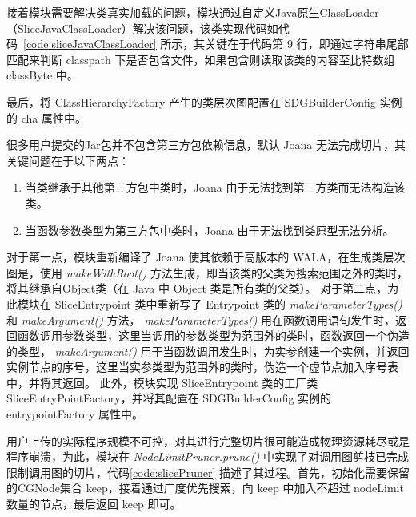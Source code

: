 \begin{minipage}[!htbp]{0.9\textwidth}
    
\end{minipage}

接着模块需要解决类真实加载的问题，模块通过自定义Java原生ClassLoader（SliceJavaClassLoader）解决该问题，该类实现代码如代码~\ref{code:sliceJavaClassLoader} 所示，其关键在于代码第 9 行，即通过字符串尾部匹配来判断 classpath 下是否包含文件，如果包含则读取该类的内容至比特数组 classByte 中。 

\begin{minipage}[!htbp]{0.9\textwidth}
    
\end{minipage}

最后，将 ClassHierarchyFactory 产生的类层次图配置在 SDGBuilderConfig 实例的 cha 属性中。

很多用户提交的Jar包并不包含第三方包依赖信息，默认 Joana 无法完成切片，其关键问题在于以下两点：
\begin{enumerate}
    \item 当类继承于其他第三方包中类时，Joana 由于无法找到第三方类而无法构造该类。
    \item 当函数参数类型为第三方包中类时，Joana 由于无法找到类原型无法分析。
\end{enumerate}

对于第一点，模块重新编译了 Joana 使其依赖于高版本的 WALA，在生成类层次图是，使用 \textit{makeWithRoot()} 方法生成，即当该类的父类为搜索范围之外的类时，将其继承自Object类（在 Java 中 Object 类是所有类的父类）。
对于第二点，为此模块在 SliceEntrypoint 类中重新写了 Entrypoint 类的\textit{ makeParameterTypes()} 和 \textit{makeArgument()} 方法，\textit{ makeParameterTypes()} 用在函数调用语句发生时，返回函数调用参数类型，这里当调用的参数类型为范围外的类时，函数返回一个伪造的类型，\textit{ makeArgument()} 用于当函数调用发生时，为实参创建一个实例，并返回实例节点的序号，这里当实参类型为范围外的类时，伪造一个虚节点加入序号表中，并将其返回。
此外，模块实现 SliceEntrypoint 类的工厂类 SliceEntryPointFactory，并将其配置在 SDGBuilderConfig 实例的 entrypointFactory 属性中。


用户上传的实际程序规模不可控，对其进行完整切片很可能造成物理资源耗尽或是程序崩溃，为此，模块在 \textit{NodeLimitPruner.prune()} 中实现了对调用图剪枝已完成限制调用图的切片，代码\ref{code:slicePruner} 描述了其过程。首先，初始化需要保留的CGNode集合 keep，接着通过广度优先搜索，向 keep 中加入不超过 nodeLimit 数量的节点，最后返回 keep 即可。

